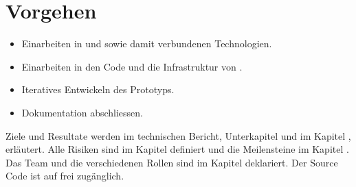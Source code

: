 \section{Vorgehen}
\begin{itemize}
	\item Einarbeiten in  und  sowie damit verbundenen Technologien.
	\item Einarbeiten in den Code und die Infrastruktur von \kort{}.
	\item Iteratives Entwickeln des Prototyps.
	\item Dokumentation abschliessen.
\end{itemize}

Ziele und Resultate werden im technischen Bericht, Unterkapitel  und im Kapitel , erläutert.
Alle Risiken sind im Kapitel  definiert und die Meilensteine im Kapitel .
Das Team und die verschiedenen Rollen sind im Kapitel  deklariert.
Der Source Code ist auf  frei zugänglich.
